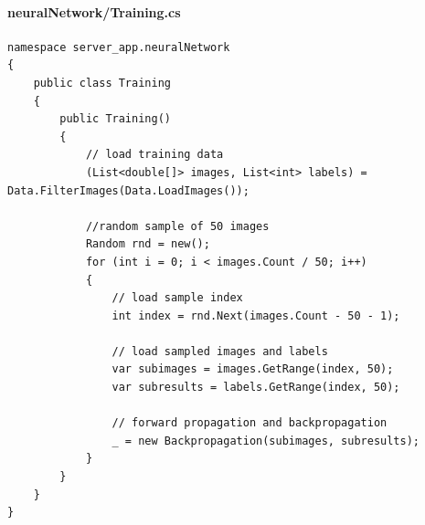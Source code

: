 \documentclass{article}
\begin{document}
\paragraph{neuralNetwork/Training.cs}\label{server/neuralnetwork/training.cs}
\begin{verbatim}
namespace server_app.neuralNetwork
{
    public class Training
    {
        public Training()
        {
            // load training data
            (List<double[]> images, List<int> labels) = Data.FilterImages(Data.LoadImages());

			//random sample of 50 images
			Random rnd = new();
			for (int i = 0; i < images.Count / 50; i++)
			{
				// load sample index
				int index = rnd.Next(images.Count - 50 - 1);

				// load sampled images and labels
				var subimages = images.GetRange(index, 50);
				var subresults = labels.GetRange(index, 50);

				// forward propagation and backpropagation
				_ = new Backpropagation(subimages, subresults);
			}
		}
	}
}
\end{verbatim}
\end{document}

